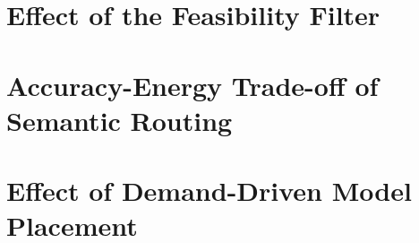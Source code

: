 \section{Effect of the Feasibility Filter}
\label{sec:eval-filter}

\section{Accuracy-Energy Trade-off of Semantic Routing}
\label{sec:eval-routing}

\section{Effect of Demand-Driven Model Placement}
\label{sec:eval-placement}
